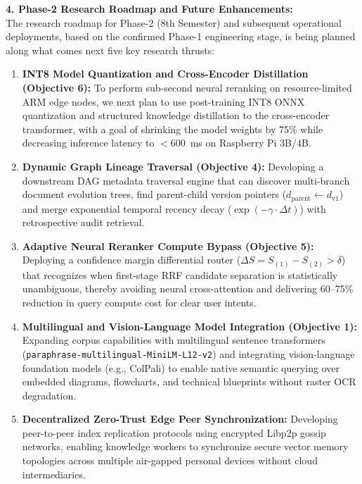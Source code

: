 \documentclass[a4paper,12pt]{article}
\begin{document}
\vspace{0.4em}
\noindent\textbf{4. Phase-2 Research Roadmap and Future Enhancements:}\\
The research roadmap for Phase-2 (8th Semester) and subsequent operational deployments, based on the confirmed Phase-1 engineering stage, is being planned along what comes next five key research thrusts:
\begin{enumerate}
    \setlength{\itemsep}{2pt}
    \setlength{\parskip}{0pt}
    \item \textbf{INT8 Model Quantization and Cross-Encoder Distillation (Objective 6):} To perform sub-second neural reranking on resource-limited ARM edge nodes, we next plan to use post-training INT8 ONNX quantization and structured knowledge distillation to the cross-encoder transformer, with a goal of shrinking the model weights by 75\% while decreasing inference latency to $< 600$~ms on Raspberry Pi 3B/4B.
    \item \textbf{Dynamic Graph Lineage Traversal (Objective 4):} Developing a downstream DAG metadata traversal engine that can discover multi-branch document evolution trees, find parent-child version pointers ($d_{\text{parent}} \leftarrow d_{\text{v1}}$) and merge exponential temporal recency decay ($\exp(-\gamma \cdot \Delta t)$) with retrospective audit retrieval.
    \item \textbf{Adaptive Neural Reranker Compute Bypass (Objective 5):} Deploying a confidence margin differential router ($\Delta S = S_{(1)} - S_{(2)} > \delta$) that recognizes when first-stage RRF candidate separation is statistically unambiguous, thereby avoiding neural cross-attention and delivering 60--75\% reduction in query compute cost for clear user intents.
    \item \textbf{Multilingual and Vision-Language Model Integration (Objective 1):} Expanding corpus capabilities with multilingual sentence transformers (\texttt{paraphrase-multilingual-MiniLM-L12-v2}) and integrating vision-language foundation models (e.g., ColPali) to enable native semantic querying over embedded diagrams, flowcharts, and technical blueprints without raster OCR degradation.
    \item \textbf{Decentralized Zero-Trust Edge Peer Synchronization:} Developing peer-to-peer index replication protocols using encrypted Libp2p gossip networks, enabling knowledge workers to synchronize secure vector memory topologies across multiple air-gapped personal devices without cloud intermediaries.
\end{enumerate}
\end{document}
